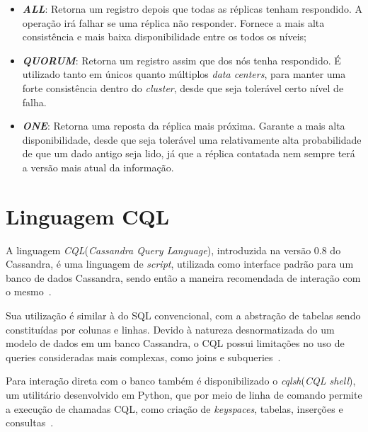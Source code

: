 \begin{itemize}

\item \textbf{\emph{ALL}}: Retorna um registro depois que todas as réplicas tenham respondido. A operação irá falhar se uma réplica não responder. Fornece a mais alta consistência e mais baixa disponibilidade entre os todos os níveis; 

\item \textbf{\emph{QUORUM}}: Retorna um registro assim que dos nós tenha respondido. É utilizado tanto em únicos quanto múltiplos \emph{data centers}, para manter uma forte consistência dentro do \emph{cluster}, desde que seja tolerável certo nível de falha.

\item \textbf{\emph{ONE}}: Retorna uma reposta da réplica mais próxima. Garante a mais alta disponibilidade, desde que seja tolerável uma relativamente alta probabilidade de que um dado antigo seja lido, já que a réplica contatada nem sempre terá a versão mais atual da informação.

\end{itemize}

\section{Linguagem CQL}
A linguagem \emph{CQL}(\emph{Cassandra Query Language}), introduzida na versão 0.8 do Cassandra, é uma linguagem de \emph{script}, utilizada como interface padrão para um banco de dados Cassandra, sendo então a maneira recomendada de interação com o mesmo~\cite{cassandraguide}. 

Sua utilização é similar à do SQL convencional, com a abstração de tabelas sendo constituídas por colunas e linhas. Devido à natureza desnormatizada do um modelo de dados em um banco Cassandra, o CQL possui limitações no uso de queries consideradas mais complexas, como joins e subqueries~\cite{cassandraguide}.

Para interação direta com o banco também é disponibilizado o \emph{cqlsh}(\emph{CQL shell}), um utilitário desenvolvido em Python, que por meio de linha de comando permite a execução de chamadas CQL, como criação de \emph{keyspaces}, tabelas, inserções e consultas~\cite{cassandra_intro_cql}.
